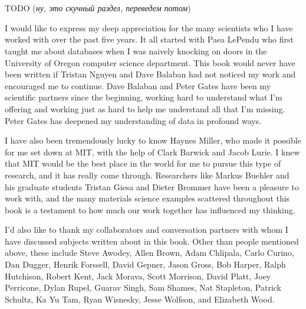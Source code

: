 \documentclass[CT4S-EN-RU]{subfiles}
\begin{document}
\section{}

\begin{blockRUS}
TODO ({\em ну, это скучный раздел, переведем потом}) 
\end{blockRUS}

\begin{blockENG}
I would like to express my deep appreciation for the many scientists who I have worked with over the past five years. It all started with Paea LePendu who first taught me about databases when I was naively knocking on doors in the University of Oregon computer science department. This book would never have been written if Tristan Nguyen and Dave Balaban had not noticed my work and encouraged me to continue. Dave Balaban and Peter Gates have been my scientific partners since the beginning, working hard to understand what I'm offering and working just as hard to help me understand all that I'm missing. Peter Gates has deepened my understanding of data in profound ways.
\end{blockENG}

\begin{blockRUS}
\end{blockRUS} 

\begin{blockENG}
I have also been tremendously lucky to know Haynes Miller, who made it possible for me set down at MIT, with the help of Clark Barwick and Jacob Lurie. I knew that MIT would be the best place in the world for me to pursue this type of research, and it has really come through. Researchers like Markus Buehler and his graduate students Tristan Giesa and Dieter Brommer have been a pleasure to work with, and the many materials science examples scattered throughout this book is a testament to how much our work together has influenced my thinking.
\end{blockENG}

\begin{blockRUS}
\end{blockRUS}

\begin{blockENG}
I'd also like to thank my collaborators and conversation partners with whom I have discussed subjects written about in this book. Other than people mentioned above, these include Steve Awodey, Allen Brown, Adam Chlipala, Carlo Curino, Dan Dugger, Henrik Forssell, David Gepner, Jason Gross, Bob Harper, Ralph Hutchison, Robert Kent, Jack Morava, Scott Morrison, David Platt, Joey Perricone, Dylan Rupel, Guarav Singh, Sam Shames, Nat Stapleton, Patrick Schultz, Ka Yu Tam, Ryan Wisnesky, Jesse Wolfson, and Elizabeth Wood.
\end{blockENG}
\end{document}
